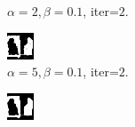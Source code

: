 \documentclass{article}
\begin{document}
\begin{figure}[t]
\begin{subfigure}[t]{0.27\textwidth}
  \vspace{-0.6cm}
  \caption{$\alpha=2, \beta=0.1$, iter=$2$.}
\end{subfigure}
\begin{subfigure}[t]{0.27\textwidth}
  \centering
  \includegraphics[width=\textwidth]{ii_alpha_5_beta_0.1_iterations_3.bmp}
  \vspace{-0.6cm}
  \caption{$\alpha=5, \beta=0.1$, iter=$2$.}
\end{subfigure}
\begin{subfigure}[t]{0.27\textwidth}
  \centering
  \includegraphics[width=\textwidth]{ii_alpha_10_beta_0.1_iterations_3.bmp}

\end{subfigure}
\end{figure}
\end{document}
